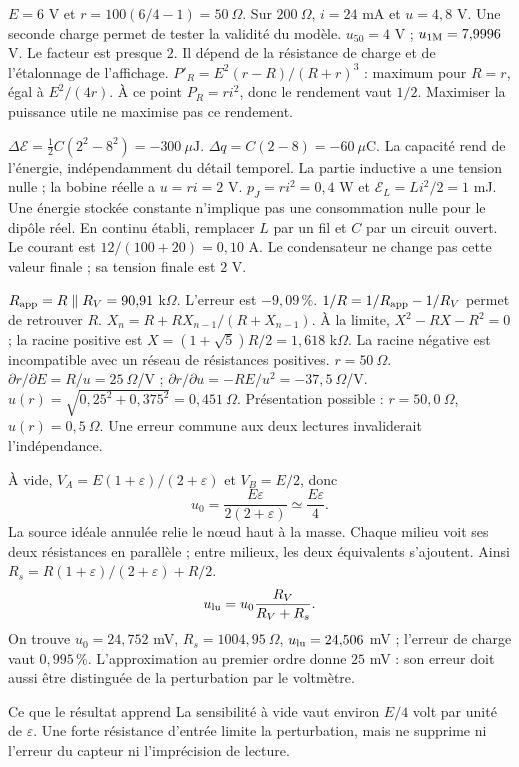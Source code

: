 $E=6$ V et $r=100(6/4-1)=50\ \Omega$. Sur $200\ \Omega$, $i=24$ mA et $u=4{,}8$ V. Une seconde charge permet de tester la validité du modèle.
$u_{50}=4$ V ; $u_{1\rm M}=7{,}9996$ V. Le facteur est presque $2$. Il dépend de la résistance de charge et de l’étalonnage de l’affichage.
$P'_R=E^2(r-R)/(R+r)^3$ : maximum pour $R=r$, égal à $E^2/(4r)$. À ce point $P_R=ri^2$, donc le rendement vaut $1/2$. Maximiser la puissance utile ne maximise pas ce rendement.


$\Delta\mathcal E=\tfrac12C(2^2-8^2)=-300\ \mu\mathrm{ J}$. $\Delta q=C(2-8)=-60\ \mu\mathrm{ C}$. La capacité rend de l’énergie, indépendamment du détail temporel.
La partie inductive a une tension nulle ; la bobine réelle a $u=ri=2$ V. $p_J=ri^2=0{,}4$ W et $\mathcal E_L=Li^2/2=1$ mJ. Une énergie stockée constante n’implique pas une consommation nulle pour le dipôle réel.
En continu établi, remplacer $L$ par un fil et $C$ par un circuit ouvert. Le courant est $12/(100+20)=0{,}10$ A. Le condensateur ne change pas cette valeur finale ; sa tension finale est $2$ V.


$R_{\rm app}=R\parallel R_V=90{,}91$ k$\Omega$. L’erreur est $-9{,}09\,\%$. $1/R=1/R_{\rm app}-1/R_V$ permet de retrouver $R$.
$X_n=R+RX_{n-1}/(R+X_{n-1})$. À la limite, $X^2-RX-R^2=0$ ; la racine positive est $X=(1+\sqrt5)R/2=1{,}618$ k$\Omega$. La racine négative est incompatible avec un réseau de résistances positives.
$r=50\ \Omega$. $\partial r/\partial E=R/u=25\ \Omega$/V ; $\partial r/\partial u=-RE/u^2=-37{,}5\ \Omega$/V. $u(r)=\sqrt{0{,}25^2+0{,}375^2}=0{,}451\ \Omega$. Présentation possible : $r=50{,}0\ \Omega$, $u(r)=0{,}5\ \Omega$. Une erreur commune aux deux lectures invaliderait l’indépendance.


À vide, $V_A=E(1+\varepsilon)/(2+\varepsilon)$ et $V_B=E/2$, donc
\[u_0=\frac{E\varepsilon}{2(2+\varepsilon)}\simeq\frac{E\varepsilon}{4}.\]
La source idéale annulée relie le nœud haut à la masse. Chaque milieu voit ses deux résistances en parallèle ; entre milieux, les deux équivalents s’ajoutent. Ainsi $R_s=R(1+\varepsilon)/(2+\varepsilon)+R/2$.
\[u_{\rm lu}=u_0\frac{R_V}{R_V+R_s}.\]
On trouve $u_0=24{,}752$ mV, $R_s=1004{,}95\ \Omega$, $u_{\rm lu}=24{,}506$ mV ; l’erreur de charge vaut $0{,}995\,\%$. L’approximation au premier ordre donne $25$ mV : son erreur doit aussi être distinguée de la perturbation par le voltmètre.
\begin{methode}{Ce que le résultat apprend}
La sensibilité à vide vaut environ $E/4$ volt par unité de $\varepsilon$. Une forte résistance d’entrée limite la perturbation, mais ne supprime ni l’erreur du capteur ni l’imprécision de lecture.
\end{methode}


